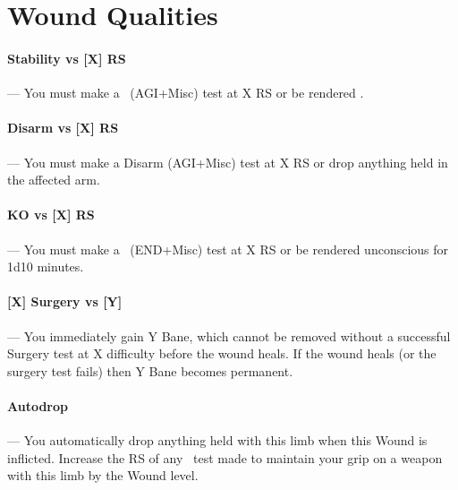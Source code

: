 \documentclass[oneside,11pt,english]{book}
\begin{document}



\section{Wound Qualities}

\paragraph[Stability vs. ]{\label{par:Stability vs}Stability vs [X] RS}---\quad
You must make a ~(AGI+Misc) test at X RS or be rendered .

\vspace{-8pt}\paragraph[Disarm vs. ]{\label{par:Disarm vs}Disarm vs [X] RS}---\quad
You must make a Disarm (AGI+Misc) test at X RS or drop anything held in the affected arm.

\vspace{-5pt}\paragraph[KO vs. ]{\label{par:KO vs}KO vs [X] RS }---\quad
You must make a ~(END+Misc) test at X RS or be rendered unconscious for 1d10 minutes.

\vspace{-5pt}\paragraph[Surgery vs. ]{\label{par:Surgery vs}[X] Surgery vs [Y]}---\quad
You immediately gain Y Bane, which cannot be removed without a successful Surgery test at X difficulty before the wound heals. If the wound heals (or the surgery test fails) then Y Bane becomes permanent.

\vspace{-5pt}\paragraph{\label{par:Autodrop}Autodrop}---\quad 
You automatically drop anything held with this limb when this Wound is inflicted. Increase the RS of any ~test made to maintain your grip on a weapon with this limb by the Wound level. %
\end{document}
